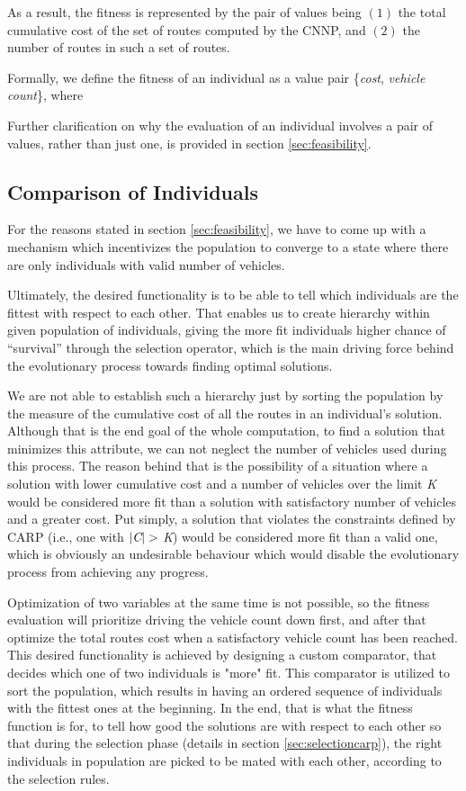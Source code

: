 \documentclass[twoside]{ctuthesis}
\theoremstyle{plain}
\theoremstyle{definition}
\theoremstyle{note}
\begin{document}
As a result, the fitness is represented by the pair of values being \emph{$(1)$} the total cumulative cost of the set of routes computed by the CNNP, and \emph{$(2)$} the number of routes in such a set of routes. 

Formally, we define the fitness of an individual as a value pair \{\emph{cost}, \emph{vehicle count}\}, where


Further clarification on why the evaluation of an individual involves a pair of values, rather than just one, is provided in section \ref{sec:feasibility}.


\subsection{Comparison of Individuals}
\label{sec:sorting}
For the reasons stated in section \ref{sec:feasibility}, we have to come up with a mechanism which incentivizes the population to converge to a state where there are only individuals with valid number of vehicles.

Ultimately, the desired functionality is to be able to tell which individuals are the fittest with respect to each other. That enables us to create hierarchy within given population of individuals, giving the more fit individuals higher chance of ``survival'' through the selection operator, which is the main driving force behind the evolutionary process towards finding optimal solutions.

We are not able to establish such a hierarchy just by sorting the population by the measure of the cumulative cost of all the routes in an individual's solution. Although that is the end goal of the whole computation, to find a solution that minimizes this attribute, we can not neglect the number of vehicles used during this process. The reason behind that is the possibility of a situation where a solution with lower cumulative cost and a number of vehicles over the limit \emph{K} would be considered more fit than a solution with satisfactory number of vehicles and a greater cost. Put simply, a solution that violates the constraints defined by CARP (i.e., one with $|\emph{C}| > $ \emph{K}) would be considered more fit than a valid one, which is obviously an undesirable behaviour which would disable the evolutionary process from achieving any progress.

Optimization of two variables at the same time is not possible, so the fitness evaluation will prioritize driving the vehicle count down first, and after that optimize the total routes cost when a satisfactory vehicle count has been reached.
This desired functionality is achieved by designing a custom comparator, that decides which one of two individuals is "more" fit. This comparator is utilized to sort the population, which results in having an ordered sequence of individuals with the fittest ones at the beginning. In the end, that is what the fitness function is for, to tell how good the solutions are with respect to each other so that during the selection phase (details in section \ref{sec:selectioncarp}), the right individuals in population are picked to be mated with each other, according to the selection rules. 
\end{document}

